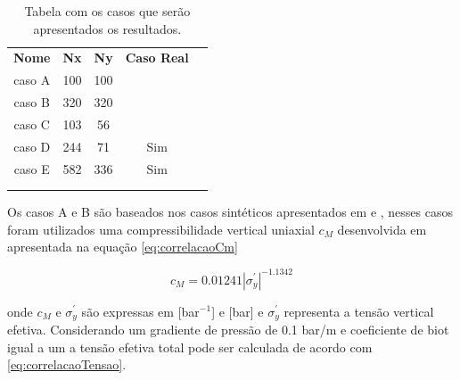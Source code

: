 \begin{table}[]
    \caption{Tabela com os casos que serão apresentados os resultados.}\label{tab:descricaoModelos}
    \centering
    \begin{tabular}{ccccl}
    \cline{1-4}
    \multicolumn{1}{|c|}{\textbf{Nome}} & \multicolumn{1}{c|}{\textbf{Nx}} & \multicolumn{1}{c|}{\textbf{Ny}} & \multicolumn{1}{c|}{\textbf{Caso Real}} &  \\ \cline{1-4}
    \multicolumn{1}{|c|}{caso A}        & \multicolumn{1}{c|}{100}         & \multicolumn{1}{c|}{100}         & \multicolumn{1}{c|}{}                   &  \\ \cline{1-4}
    \multicolumn{1}{|c|}{caso B}        & \multicolumn{1}{c|}{320}         & \multicolumn{1}{c|}{320}         & \multicolumn{1}{c|}{}                   &  \\ \cline{1-4}
    \multicolumn{1}{|c|}{caso C}        & \multicolumn{1}{c|}{103}         & \multicolumn{1}{c|}{56}          & \multicolumn{1}{c|}{}                   &  \\ \cline{1-4}
    \multicolumn{1}{|c|}{caso D}        & \multicolumn{1}{c|}{244}         & \multicolumn{1}{c|}{71}          & \multicolumn{1}{c|}{Sim}                &  \\ \cline{1-4}
    \multicolumn{1}{|c|}{caso E}        & \multicolumn{1}{c|}{582}         & \multicolumn{1}{c|}{336}         & \multicolumn{1}{c|}{Sim}                &  \\ \cline{1-4}
    \multicolumn{1}{l}{}                & \multicolumn{1}{l}{}             & \multicolumn{1}{l}{}             & \multicolumn{1}{l}{}                    &  \\
    \multicolumn{1}{l}{}                & \multicolumn{1}{l}{}             & \multicolumn{1}{l}{}             & \multicolumn{1}{l}{}                    & 
    \end{tabular}
\end{table}


Os casos A e B são baseados nos casos sintéticos apresentados em \cite{casteletto} e \cite{irina}, nesses casos foram utilizados
uma compressibilidade vertical uniaxial $c_M$ desenvolvida em \cite{correlacaoE} apresentada na equação \ref{eq:correlacaoCm}

\begin{equation} \label{eq:correlacaoCm}
    c_M = 0.01241 |\sigma_y^\prime|^{-1.1342}
\end{equation}

onde $c_M$ e $\sigma_y^\prime$ são expressas em [bar$^{-1}$] e [bar] e  $\sigma_y^\prime$ representa a tensão vertical efetiva.
Considerando um gradiente de pressão de 0.1 bar/m e coeficiente de biot igual a um a tensão efetiva total pode ser calculada de acordo com \ref{eq:correlacaoTensao}.




